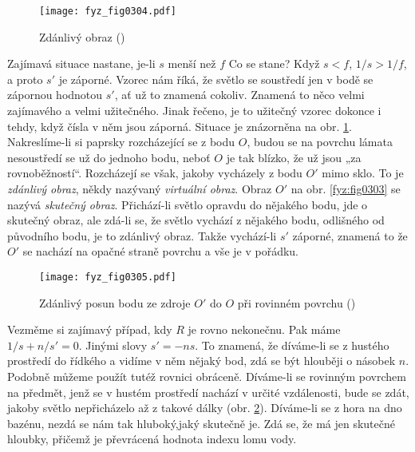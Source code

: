     \begin{figure}[ht!] %
      \centering
      \texttt{[image: fyz\_fig0304.pdf]}
      \caption{Zdánlivý obraz
               (\cite[s.~361]{Feynman01})}
      \label{fyz:fig0304}
    \end{figure}
    
    Zajímavá situace nastane, je-li \(s\) menší než \(f\) Co se stane? Když \(s<f\), \(1/s>1/f\), a
    proto \(s'\) je záporné. Vzorec nám říká, že světlo se soustředí jen v bodě se zápornou hodnotou
    \(s'\), ať už to znamená cokoliv. Znamená to něco velmi zajímavého a velmi užitečného. Jinak
    řečeno, je to užitečný vzorec dokonce i tehdy, když čísla v něm jsou záporná. Situace je
    znázorněna na obr. \ref{fyz:fig0304}. Nakreslíme-li si paprsky rozcházející se z bodu \(O\),
    budou se na povrchu lámata nesoustředí se už do jednoho bodu, neboť \(O\) je tak blízko, že už
    jsou „za rovnoběžností“. Rozcházejí se však, jakoby vycházely z bodu \(O'\) mimo sklo. To je
    \emph{zdánlivý obraz}, někdy nazývaný \emph{virtuální obraz}.  Obraz \(O'\) na obr.
    \ref{fyz:fig0303} se nazývá \emph{skutečný obraz}. Přichází-li světlo opravdu do nějakého bodu,
    jde o skutečný obraz, ale zdá-li se, že světlo vychází z nějakého bodu, odlišného od původního
    bodu, je to zdánlivý obraz. Takže vychází-li \(s'\) záporné, znamená to že \(O'\) se nachází na
    opačné straně povrchu a vše je v pořádku.
    

    \begin{figure}[ht!] %
      \centering
      \texttt{[image: fyz\_fig0305.pdf]}
      \caption{Zdánlivý posun bodu ze zdroje \(O'\) do \(O\) při rovinném povrchu
               (\cite[s.~361]{Feynman01})}
      \label{fyz:fig0305}
    \end{figure}
    
    Vezměme si zajímavý případ, kdy \(R\) je rovno nekonečnu. Pak máme \(1/s + n/s' = 0\). Jinými
    slovy \(s' = -ns\). To znamená, že díváme-li se z hustého prostředí do řídkého a vidíme v něm
    nějaký bod, zdá se být hlouběji o násobek \(n\). Podobně můžeme použít tutéž rovnici obráceně.
    Díváme-li se rovinným povrchem na předmět, jenž se v hustém prostředí nachází v určité
    vzdálenosti, bude se zdát, jakoby světlo nepřicházelo až z takové dálky (obr.
    \ref{fyz:fig0305}). Díváme-li se z hora na dno bazénu, nezdá se nám tak hluboký,jaký skutečně
    je. Zdá se, že má jen  skutečné hloubky, přičemž  je převrácená hodnota
    indexu lomu vody.
    
